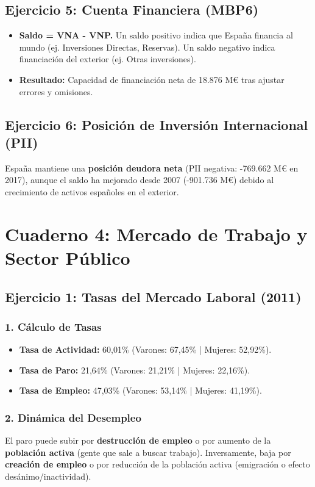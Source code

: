 \subsection{Ejercicio 5: Cuenta Financiera (MBP6)}
\begin{itemize}
    \item \textbf{Saldo = VNA - VNP.} Un saldo positivo indica que España financia al mundo (ej. Inversiones Directas, Reservas). Un saldo negativo indica financiación del exterior (ej. Otras inversiones).
    \item \textbf{Resultado:} Capacidad de financiación neta de 18.876 M€ tras ajustar errores y omisiones.
\end{itemize}

\subsection{Ejercicio 6: Posición de Inversión Internacional (PII)}
España mantiene una \textbf{posición deudora neta} (PII negativa: -769.662 M€ en 2017), aunque el saldo ha mejorado desde 2007 (-901.736 M€) debido al crecimiento de activos españoles en el exterior.

\section{Cuaderno 4: Mercado de Trabajo y Sector Público}

\subsection{Ejercicio 1: Tasas del Mercado Laboral (2011)}

\subsubsection{1. Cálculo de Tasas}
\begin{itemize}
    \item \textbf{Tasa de Actividad:} 60,01\% (Varones: 67,45\% | Mujeres: 52,92\%).
    \item \textbf{Tasa de Paro:} 21,64\% (Varones: 21,21\% | Mujeres: 22,16\%).
    \item \textbf{Tasa de Empleo:} 47,03\% (Varones: 53,14\% | Mujeres: 41,19\%).
\end{itemize}

\subsubsection{2. Dinámica del Desempleo}
El paro puede subir por \textbf{destrucción de empleo} o por aumento de la \textbf{población activa} (gente que sale a buscar trabajo). Inversamente, baja por \textbf{creación de empleo} o por reducción de la población activa (emigración o efecto desánimo/inactividad).

